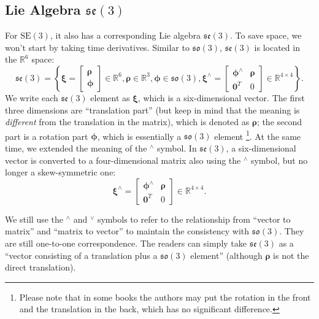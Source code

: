 \subsection{Lie Algebra $\mathfrak{se}(3)$}
For $\mathrm{SE}(3)$, it also has a corresponding Lie algebra $\mathfrak{se}(3)$. To save space, we won't start by taking time derivatives. Similar to $\mathfrak{so}(3)$, $\mathfrak{se}(3)$ is located in the $\mathbb{R}^6$ space:
\begin{equation}
\mathfrak{se}(3) = \left\{ { \boldsymbol{\xi} = \left[ \begin{array}{l}
    \boldsymbol{\rho} \\
    \boldsymbol{\phi}
    \end{array} \right]
    \in { \mathbb{R}^6} ,
    \boldsymbol{\rho} \in { \mathbb{R}^3}, \boldsymbol{\phi} \in \mathfrak{so} \left( 3 \right),{ \boldsymbol{\xi} ^ \wedge } = \left[ {\begin{array}{*{20}{c}}
        {{ \boldsymbol{\phi} ^ \wedge }}& \boldsymbol{\rho} \\
        {{\mathbf{0}^T}}&0
        \end{array}} \right] \in { \mathbb{R}^{4 \times 4}}} \right\}.
\end{equation}
We write each $\mathfrak{se}(3)$ element as $\boldsymbol{\xi}$, which is a six-dimensional vector. The first three dimensions are ``translation part'' (but keep in mind that the meaning is \textit{different} from the translation in the matrix), which is denoted as $\boldsymbol{\rho}$; the second part is a rotation part $\boldsymbol{\phi}$, which is essentially a $\mathfrak{so}(3)$ element \footnote{Please note that in some books the authors may put the rotation in the front and the translation in the back, which has no significant difference.}. At the same time, we extended the meaning of the $^\wedge$ symbol. In $\mathfrak{se}(3)$, a six-dimensional vector is converted to a four-dimensional matrix also using the $^\wedge$ symbol, but no longer a skew-symmetric one:
\begin{equation}
{ \boldsymbol{\xi} ^ \wedge } = \left[ {\begin{array}{*{20}{c}}
    {{ \boldsymbol{\phi} ^ \wedge }}& \boldsymbol{\rho} \\
    {{\mathbf{0}^T}}&0
    \end{array}} \right] \in { \mathbb{R}^{4 \times 4}}.
\end{equation}

We still use the $^\wedge$ and $^\vee$ symbols to refer to the relationship from ``vector to matrix'' and ``matrix to vector'' to maintain the consistency with $\mathfrak{so}(3)$. They are still one-to-one correspondence. The readers can simply take $\mathfrak{se}(3)$ as a ``vector consisting of a translation plus a $\mathfrak{so}(3)$ element'' (although $\boldsymbol{\rho} $ is not the direct translation). 

